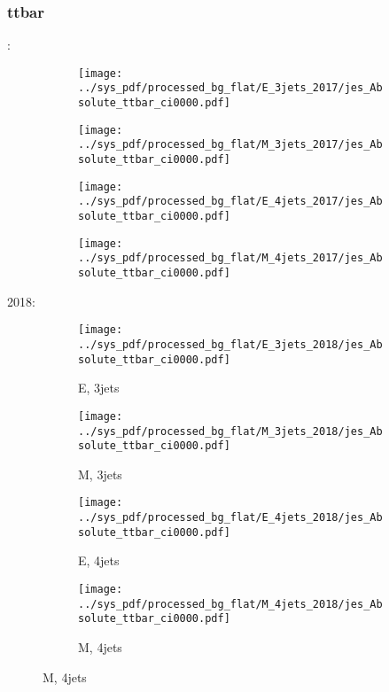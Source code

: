 \documentclass{beamer}
\begin{document}
\begin{frame}
\frametitle{ttbar}
\fontsize{5}{1}:
\begin{figure}
\centering
\begin{subfigure}[b]{0.24\textwidth}
\texttt{[image: ../sys\_pdf/processed\_bg\_flat/E\_3jets\_2017/jes\_Absolute\_ttbar\_ci0000.pdf]}
\end{subfigure}
\begin{subfigure}[b]{0.24\textwidth}
\texttt{[image: ../sys\_pdf/processed\_bg\_flat/M\_3jets\_2017/jes\_Absolute\_ttbar\_ci0000.pdf]}
\end{subfigure}
\begin{subfigure}[b]{0.24\textwidth}
\texttt{[image: ../sys\_pdf/processed\_bg\_flat/E\_4jets\_2017/jes\_Absolute\_ttbar\_ci0000.pdf]}
\end{subfigure}
\begin{subfigure}[b]{0.24\textwidth}
\texttt{[image: ../sys\_pdf/processed\_bg\_flat/M\_4jets\_2017/jes\_Absolute\_ttbar\_ci0000.pdf]}
\end{subfigure}
\end{figure}
2018:
\begin{figure}
\centering
\begin{subfigure}[b]{0.24\textwidth}
\texttt{[image: ../sys\_pdf/processed\_bg\_flat/E\_3jets\_2018/jes\_Absolute\_ttbar\_ci0000.pdf]}
\captionsetup{font=tiny}
\caption{E, 3jets}
\end{subfigure}
\begin{subfigure}[b]{0.24\textwidth}
\texttt{[image: ../sys\_pdf/processed\_bg\_flat/M\_3jets\_2018/jes\_Absolute\_ttbar\_ci0000.pdf]}
\captionsetup{font=tiny}
\caption{M, 3jets}
\end{subfigure}
\begin{subfigure}[b]{0.24\textwidth}
\texttt{[image: ../sys\_pdf/processed\_bg\_flat/E\_4jets\_2018/jes\_Absolute\_ttbar\_ci0000.pdf]}
\captionsetup{font=tiny}
\caption{E, 4jets}
\end{subfigure}
\begin{subfigure}[b]{0.24\textwidth}
\texttt{[image: ../sys\_pdf/processed\_bg\_flat/M\_4jets\_2018/jes\_Absolute\_ttbar\_ci0000.pdf]}
\captionsetup{font=tiny}
\caption{M, 4jets}
\end{subfigure}
\end{figure}
\end{frame}
\end{document}
